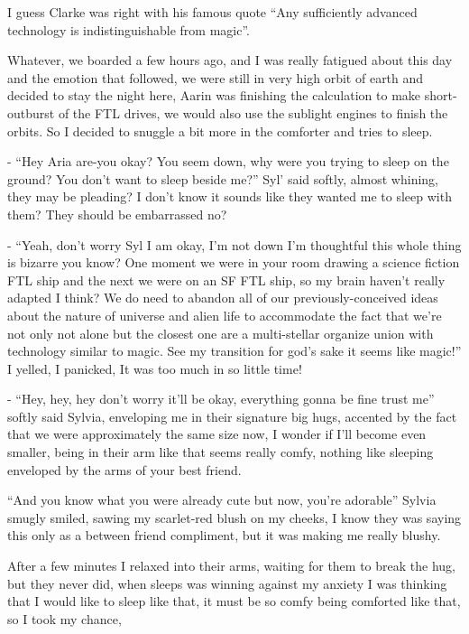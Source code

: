 \documentclass[colorlinks,12pt,a4paper]{book}
\begin{document}
I guess Clarke was right with his famous quote “Any sufficiently advanced technology is indistinguishable from magic”.\par
\bigskip

Whatever, we boarded a few hours ago, and I was really fatigued about this day and the emotion that followed, 
we were still in very high orbit of earth and decided to stay the night here, Aarin was finishing the 
calculation to make short-outburst of the FTL drives, we would also use the sublight engines to finish the orbits. 
So I decided to snuggle a bit more in the comforter and tries to sleep.\par
\bigskip

- “Hey Aria are-you okay? You seem down, why were you trying to sleep on the ground? You don't want to 
sleep beside me?” Syl' said softly, almost whining, they may be pleading? I don't know it sounds like 
they wanted me to sleep with them? They should be embarrassed no?\par
\bigskip

- “Yeah, don't worry Syl I am okay, I'm not down I'm thoughtful this whole thing is bizarre you know?
 One moment we were in your room drawing a science fiction FTL ship and the next we were on an SF FTL ship, so my 
 brain haven't really adapted I think? We do need to abandon all of our previously-conceived ideas about the 
 nature of universe and alien life to accommodate the fact that we're not only not alone but the closest one are 
 a multi-stellar organize union with technology similar to magic. See my transition for god's sake it seems 
 like magic!” I yelled, I panicked, It was too much in so little time!\par
 \bigskip

- “Hey, hey, hey don't worry it'll be okay, everything gonna be fine trust me” softly said Sylvia, enveloping 
me in their signature big hugs, accented by the fact that we were approximately the same size now, I wonder if 
I'll become even smaller, being in their arm like that seems really comfy, nothing like sleeping enveloped by the arms 
of your best friend.\par
\bigskip

“And you know what you were already cute but now, you're adorable” Sylvia smugly smiled, sawing my 
scarlet-red blush on my cheeks, I know they was saying this only as a between friend compliment, but it was 
making me really blushy.\par
\bigskip

After a few minutes I relaxed into their arms, waiting for them to break the hug, but they never did, 
when sleeps was winning against my anxiety I was thinking that I would like to sleep like that,
 it must be so comfy being comforted like that, so I took my chance,\par
 \bigskip
\end{document}
